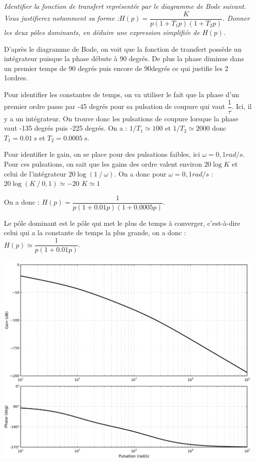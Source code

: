 \documentclass[10pt,fleqn]{article} %
\begin{document}
\begin{multicols}{2}
\subparagraph{}
\textit{Identifier la fonction de transfert représentée par le diagramme de Bode suivant. Vous justifierez notamment sa forme :$H(p)=\dfrac{K}{p(1+T_1 p)(1+T_2 p)}$. Donner les deux pôles dominants, en déduire une expression simplifiée de $H(p)$. }

\ifprof
\begin{corrige}
D’après le diagramme de Bode, on voit que la fonction de transfert possède un intégrateur puisque la phase débute à 90 degrés. De plus la phase diminue dans un premier temps de 90 degrés puis encore de 90degrés ce qui justifie les 2 1\ier ordres.

Pour identifier les constantes de temps, on va utiliser le fait que la phase d’un premier ordre passe par -45 degrés pour sa pulsation de coupure qui vaut $\dfrac{1}{\tau}$.
Ici, il y a un intégrateur. On trouve donc les pulsations de coupure lorsque la phase vaut -135 degrés puis -225 degrés. On a :
$1/T_1 \simeq 100$      et      $1/T_2 \simeq 2000$     donc    $T_1=\SI{0.01}{s}$ et
$T_2=\SI{0.0005}{s}$.

Pour identifier le gain, on se place pour des pulsations faibles, ici $\omega =0,1 rad/s$. Pour ces pulsations, on sait que les gains des \ier{} ordre valent environ $20\log K$ et celui de l’intégrateur $20\log(1⁄\omega)$. On a donc pour $\omega=0,1 rad/s$ :
$20 \log(K⁄0,1) \simeq -20 $  $K\simeq 1$

On a donc : $H(p)=\dfrac{1}{p(1+0.01p)(1+0.0005p)}$.

Le pôle dominant est le pôle qui met le plus de temps à converger, c’est-à-dire celui qui a la constante de temps la plus grande, on a donc :
$H(p)\simeq \dfrac{1}{p(1+0.01p)}$.
\end{corrige}
\else
\begin{center}
\includegraphics[width=\linewidth]{images/img_01}
\end{center}
\fi


\end{multicols}
\end{document}
